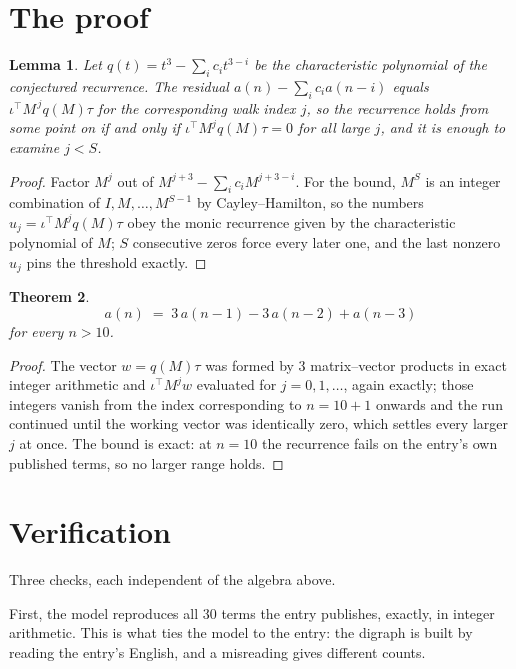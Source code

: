 \documentclass[11pt,a4paper]{article}
\theoremstyle{plain}
\newtheorem{theorem}{Theorem}
\newtheorem{lemma}[theorem]{Lemma}
\theoremstyle{definition}
\begin{document}
\section{The proof}

\begin{lemma}\label{lem:crit}
Let $q(t)=t^{3}-\sum_i c_it^{3-i}$ be the characteristic polynomial of the
conjectured recurrence. The residual $a(n)-\sum_ic_ia(n-i)$ equals
$\iota^{\!\top}M^{\,j}q(M)\tau$ for the corresponding walk index $j$, so the recurrence
holds from some point on if and only if $\iota^{\!\top}M^{j}q(M)\tau=0$ for all large $j$,
and it is enough to examine $j<S$.
\end{lemma}

\begin{proof}
Factor $M^{j}$ out of $M^{j+3}-\sum_ic_iM^{j+3-i}$. For the bound, $M^{S}$
is an integer combination of $I,M,\dots,M^{S-1}$ by Cayley--Hamilton, so the numbers
$u_j=\iota^{\!\top}M^{j}q(M)\tau$ obey the monic recurrence given by the characteristic
polynomial of $M$; $S$ consecutive zeros force every later one, and the last nonzero $u_j$
pins the threshold exactly.
\end{proof}

\begin{theorem}
\[
a(n)\;=\;3\,a(n-1) - 3\,a(n-2) + a(n-3)
\]
for every $n>10$.
\end{theorem}

\begin{proof}
The vector $w=q(M)\tau$ was formed by $3$ matrix--vector products in exact integer
arithmetic and $\iota^{\!\top}M^{j}w$ evaluated for $j=0,1,\dots$, again exactly; those
integers vanish from the index corresponding to $n=10+1$ onwards and the run continued
until the working vector was identically zero, which settles every larger $j$ at once. The bound is exact: at $n=10$ the recurrence fails on the entry's own published terms, so no larger range holds.
\end{proof}

\section{Verification}

Three checks, each independent of the algebra above.

First, the model reproduces all $30$ terms the entry publishes, exactly, in integer
arithmetic. This is what ties the model to the entry: the digraph is built by reading the
entry's English, and a misreading gives different counts.
\end{document}
